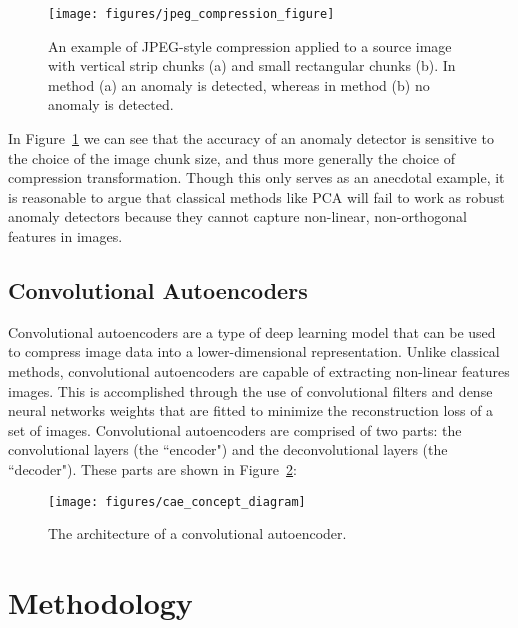 \documentclass[12pt]{article}
\begin{document}
\begin{figure}[H]
\begin{center}
\texttt{[image: figures/jpeg\_compression\_figure]}
\end{center}
\caption{An example of JPEG-style compression applied to a source image with vertical strip chunks (a) and small rectangular chunks (b). In method (a) an anomaly is detected, whereas in method (b) no anomaly is detected.}
\label{fig:simple_jpeg}
\end{figure}

In Figure~\ref{fig:simple_jpeg} we can see that the accuracy of an anomaly detector is sensitive to the choice of the image chunk size, and thus more generally the choice of compression transformation. Though this only serves as an anecdotal example, it is reasonable to argue that classical methods like PCA will fail to work as robust anomaly detectors because they cannot capture non-linear, non-orthogonal features in images. 

\subsection{Convolutional Autoencoders}

Convolutional autoencoders are a type of deep learning model that can be used to compress image data into a lower-dimensional representation. Unlike classical methods, convolutional autoencoders are capable of extracting non-linear features images. This is accomplished through the use of convolutional filters and dense neural networks weights that are fitted to minimize the reconstruction loss of a set of images. Convolutional autoencoders are comprised of two parts: the convolutional layers (the ``encoder") and the deconvolutional layers (the ``decoder"). These parts are shown in Figure~\ref{fig:conv_autoencoder}:

\begin{figure}[H]
\begin{center}
\texttt{[image: figures/cae\_concept\_diagram]}
\end{center}
\caption{The architecture of a convolutional autoencoder.}
\label{fig:conv_autoencoder}
\end{figure}



\section{Methodology}
\end{document}

